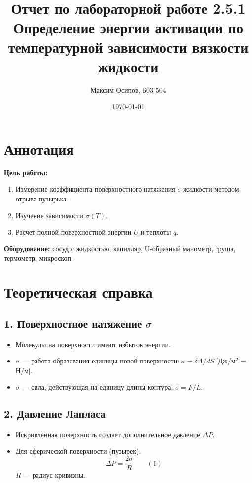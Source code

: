 \documentclass[a4paper, 12pt]{article}
\title{Отчет по лабораторной работе 2.5.1 \\ Определение энергии активации по температурной зависимости вязкости жидкости}
\author{Максим Осипов, Б03-504}
\date{\today}
\begin{document}
\maketitle

\section*{Аннотация}
\textbf{Цель работы:}
\begin{enumerate}
    \item Измерение коэффициента поверхностного натяжения $\sigma$ жидкости методом отрыва пузырька.
    \item Изучение зависимости $\sigma(T)$.
    \item Расчет полной поверхностной энергии $U$ и теплоты $q$.
\end{enumerate}

\textbf{Оборудование:} сосуд с жидкостью, капилляр, U-образный манометр, груша, термометр, микроскоп.

\section{Теоретическая справка}

\subsection*{1. Поверхностное натяжение $\sigma$}
\begin{itemize}
    \item Молекулы на поверхности имеют избыток энергии.
    \item $\sigma$ — работа образования единицы новой поверхности: $\sigma = \delta A / dS$ [Дж/м$^2$ = Н/м].
    \item $\sigma$ — сила, действующая на единицу длины контура: $\sigma = F / L$.
\end{itemize}

\subsection*{2. Давление Лапласа}
\begin{itemize}
    \item Искривленная поверхность создает дополнительное давление $\Delta P$.
    \item Для сферической поверхности (пузырек):
    \[
    \Delta P = \frac{2\sigma}{R} \qquad (1)
    \]
    $R$ — радиус кривизны.
\end{itemize}
\end{document}
